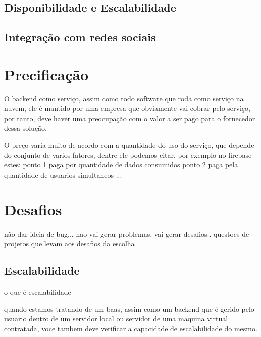 
	\subsection{Disponibilidade e Escalabilidade}


	\subsection{Integração com redes sociais}


\section{Precificação}%
\label{sec:pricing}

	O backend como serviço, assim como todo software que roda como serviço na nuvem, ele é mantido por uma empresa que obviamente vai cobrar pelo serviço, por tanto, deve haver uma preocupação com o valor a ser pago para o fornecedor dessa solução.
	
	O preço varia muito de acordo com a quantidade do uso do serviço, que depende do conjunto de varios fatores, dentre ele podemos citar, por exemplo no firebase estes:
		ponto 1 paga por quantidade de dados consumidos
		ponto 2 paga pela quantidade de usuarios simultaneos
		...


\section{Desafios}
	não dar ideia de bug... nao vai gerar problemas, vai gerar desafios.. questoes de projetos que levam aos desafios da escolha
	

	\subsection{Escalabilidade}%
	o que é escalabilidade

	quando estamos tratando de um baas, assim como um backend que é gerido pelo usuario dentro de um servidor local ou servidor de uma maquina virtual contratada, voce tambem deve verificar a capacidade de escalabilidade do mesmo.

